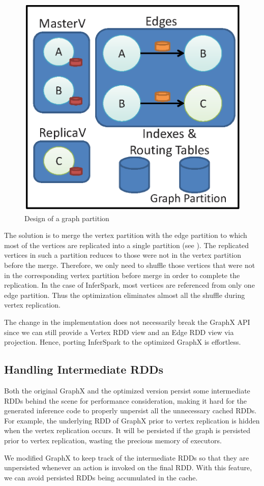 \begin{figure}
	\centering
	\includegraphics[scale=0.5,clip]{figs/graph_partition.eps}
	\caption{Design of a graph partition}
	\label{fig:inferspark_graph_partition}
\end{figure}

The solution is to merge the vertex partition with the edge partition to which
most of the vertices are replicated into a single partition (see
).  The replicated vertices in such a
partition reduces to those were not in the vertex partition before the merge.
Therefore, we only need to shuffle those vertices that were not in the
corresponding vertex partition before merge in order to complete the
replication. In the case of InferSpark, most vertices are referenced from only
one edge partition. Thus the optimization eliminates almost all the shuffle
during vertex replication.

The change in the implementation does not necessarily break the GraphX API
since we can still provide a Vertex RDD view and an Edge RDD view via
projection. Hence, porting InferSpark to the optimized GraphX is effortless.

\subsection{Handling Intermediate RDDs}

Both the original GraphX and the optimized version persist some intermediate
RDDs behind the scene for performance consideration, making it hard for the
generated inference code to properly unpersist all the unnecessary cached
RDDs. For example, the underlying RDD of GraphX prior to vertex replication is
hidden when the vertex replication occurs. It will be persisted if the graph
is persisted prior to vertex replication, wasting the precious memory of
executors.

We modified GraphX to keep track of the intermediate RDDs so that they are
unpersisted whenever an action is invoked on the final RDD. With this feature,
we can avoid persisted RDDs being accumulated in the cache.


